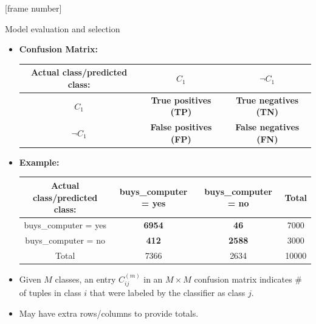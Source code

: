 \documentclass[aspectratio=169,t,table]{beamer}
\begin{document}
  {
    [frame number]
    \begin{frame}{Model evaluation and selection}
        \begin{itemize}
          \item \textbf{Confusion Matrix:}\\[0.2cm]
          \begin{tabular}{|c|c|c|}
            \hline
            Actual class/predicted class: & $C_1$ & $\neg C_1$ \\\hline
            $C_1$ & \textbf{True positives (TP)} & \textbf{True negatives (TN)} \\\hline
            $\neg C_1$ & \textbf{False positives (FP)} & \textbf{False negatives (FN)} \\\hline
          \end{tabular}
          \item \textbf{Example:}\\[0.2cm]
          \begin{tabular}{|c|c|c|c|}
            \hline
            Actual class/predicted class: & buys\_computer = yes & buys\_computer = no & Total \\\hline
            buys\_computer = yes & \textbf{6954} & \textbf{46} & 7000 \\\hline
            buys\_computer = no & \textbf{412} & \textbf{2588} & 3000 \\\hline
            Total & 7366 & 2634 & 10000 \\\hline
          \end{tabular}
          \item Given $M$ classes, an entry $C^{(m)}_{ij}$ in an $M \times M$ confusion matrix indicates \# of tuples in class $i$ that were labeled by the classifier as class $j$.
          \item May have extra rows/columns to provide totals.
      \end{itemize}
    \end{frame}
  }
\end{document}
